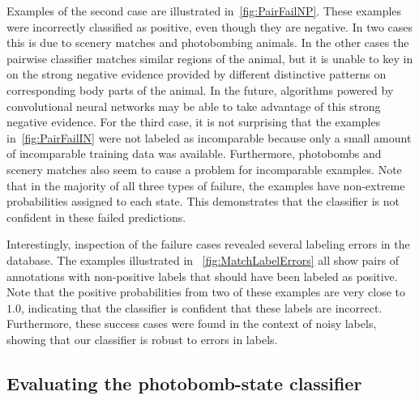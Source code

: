         Examples of the second case are illustrated in~\cref{fig:PairFailNP}.
        These examples were incorrectly classified as positive, even though they are negative.
        In two cases this is due to scenery matches and photobombing animals.
        In the other cases the pairwise classifier matches similar regions of the animal, but it is unable to key
          in on the strong negative evidence provided by different distinctive patterns on corresponding body parts
          of the animal.
        In the future, algorithms powered by convolutional neural networks may be able to take advantage of this
          strong negative evidence.
        For the third case, it is not surprising that the examples in~\cref{fig:PairFailIN} were not labeled as
          incomparable because only a small amount of incomparable training data was available.
        Furthermore, photobombs and scenery matches also seem to cause a problem for incomparable examples.
        Note that in the majority of all three types of failure, the examples have non-extreme probabilities
          assigned to each state.
        This demonstrates that the classifier is not confident in these failed predictions.

        Interestingly, inspection of the failure cases revealed several labeling errors in the database.
        The examples illustrated in ~\cref{fig:MatchLabelErrors} all show pairs of annotations with non-positive
          labels that should have been labeled as positive.
        Note that the positive probabilities from two of these examples are very close to $1.0$, indicating that
          the classifier is confident that these \groundtruth{} labels are incorrect.
        Furthermore, these success cases were found in the context of noisy \groundtruth{} labels, showing that our
          classifier is robust to errors in \groundtruth{} labels.

        \PairFailPN{}

        \PairFailNP{}

        \PairFailIN{} 

        \MatchLabelErrors{}

        \FloatBarrier{}


    \FloatBarrier{}
    \subsection{Evaluating the photobomb-state classifier}

